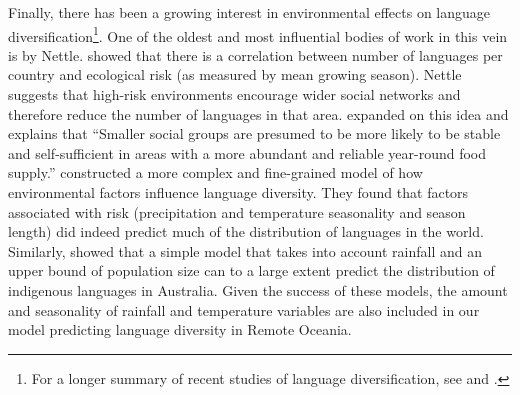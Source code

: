 \documentclass[12pt,letterpaper]{article}
\begin{document}


Finally, there has been a growing interest in environmental effects on language diversification\footnote{For a longer summary of recent studies of language diversification, see \citet{gavin2013toward} and \citet{greenhill2015demographic}.}. One of the oldest and most influential bodies of work in this vein is by Nettle. \citet{NETTLE1998} showed that there is a correlation between number of languages per country and ecological risk (as measured by mean growing season). Nettle suggests that high-risk environments encourage wider social networks and therefore reduce the number of languages in that area. \citet{hua2019ecological} expanded on this idea and explains that ``Smaller social groups are presumed to be more likely to be stable and self-sufficient in areas with a more abundant and reliable year-round food supply.'' \citet{hua2019ecological} constructed a more complex and fine-grained model of how environmental factors influence language diversity. They found that factors associated with risk (precipitation and temperature seasonality and season length) did indeed predict much of the distribution of languages in the world. Similarly, \citet{gavin2017process} showed that a simple model that takes into account rainfall and an upper bound of population size can to a large extent predict the distribution of indigenous languages in Australia. Given the success of these models, the amount and seasonality of rainfall and temperature variables are also included in our model predicting language diversity in Remote Oceania. 
\end{document}
